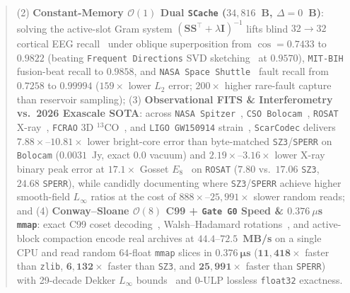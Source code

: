 \documentclass[10pt,twocolumn]{article}
\begin{document}
\begin{abstract}
(2) \textbf{Constant-Memory $\mathcal{O}(1)$ Dual \texttt{SCache} ($34{,}816$~B, $\Delta=0$~B)}: solving the active-slot Gram system $(\mathbf{S}\mathbf{S}^\top+\lambda\mathbf{I})^{-1}$ lifts blind $32\to 32$ cortical EEG recall~\citep{schalk2004bci2000,kemp1992edf} under oblique superposition from $\cos=0.7433$ to $\mathbf{0.9822}$ (beating \texttt{Frequent Directions} SVD sketching~\citep{ghashami2016frequent} at $0.9570$), \texttt{MIT-BIH} fusion-beat recall to $\mathbf{0.9858}$, and \texttt{NASA Space Shuttle}~\citep{michie1994statlog} fault recall from $0.7258$ to $\mathbf{0.99994}$ ($159\times$ lower $L_2$ error; $200\times$ higher rare-fault capture than reservoir sampling);
(3) \textbf{Observational FITS \& Interferometry vs.\ 2026 Exascale SOTA}: across \texttt{NASA Spitzer}~\citep{fazio2004irac,astropy2022project,pence2010fits}, \texttt{CSO Bolocam}~\citep{ginsburg2013bolocam}, \texttt{ROSAT} X-ray~\citep{snowden1997rosat}, \texttt{FCRAO} 3D $^{13}$CO~\citep{ridge2006complete}, and \texttt{LIGO GW150914} strain~\citep{abbott2016observation}, \texttt{ScarCodec} delivers $\mathbf{7.88\times}$--$\mathbf{10.81\times}$ lower bright-core error than byte-matched \texttt{SZ3}/\texttt{SPERR} on \texttt{Bolocam} ($0.0031$~Jy, exact $0.0$ vacuum) and $\mathbf{2.19\times}$--$\mathbf{3.16\times}$ lower X-ray binary peak error at $17.1\times$ Gosset $E_8$~\citep{viazovska2017sphere} on \texttt{ROSAT} ($7.80$ vs.\ $17.06$ \texttt{SZ3}, $24.68$ \texttt{SPERR}), while candidly documenting where \texttt{SZ3}/\texttt{SPERR} achieve higher smooth-field $L_\infty$ ratios at the cost of $888\times$--$25{,}991\times$ slower random reads; and
(4) \textbf{Conway--Sloane $\mathcal{O}(8)$ C99 + \texttt{Gate G0} Speed \& $0.376~\mu$s \texttt{mmap}}: exact C99 coset decoding~\citep{conway1982fast}, Walsh--Hadamard rotations~\citep{walsh1923closed}, and active-block compaction encode real archives at $\mathbf{44.4}$--$\mathbf{72.5}$~\textbf{MB/s} on a single CPU and read random $64$-float \texttt{mmap} slices in $\mathbf{0.376~\mu\textbf{s}}$ ($\mathbf{11{,}418\times}$ faster than \texttt{zlib}, $\mathbf{6{,}132\times}$ faster than \texttt{SZ3}, and $\mathbf{25{,}991\times}$ faster than \texttt{SPERR}) with 29-decade Dekker $L_\infty$ bounds~\citep{dekker1971floating} and $0$-ULP lossless \texttt{float32} exactness.
\end{abstract}
\end{document}
